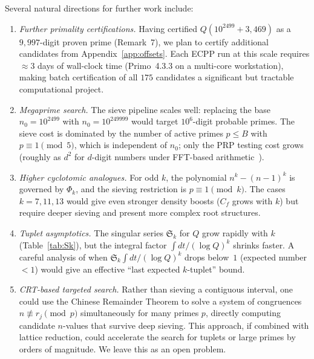 \documentclass[11pt,a4paper]{article}
\theoremstyle{plain}
\theoremstyle{definition}
\theoremstyle{remark}
\begin{document}
Several natural directions for further work include:
\begin{enumerate}[label=(\roman*)]
\item \emph{Further primality certifications.} Having certified $Q(10^{2499} + 3{,}469)$ as a $9{,}997$-digit proven prime (Remark~7), we plan to certify additional candidates from Appendix~\ref{app:offsets}. Each ECPP run at this scale requires $\approx 3$ days of wall-clock time (Primo~4.3.3 on a multi-core workstation), making batch certification of all $175$ candidates a significant but tractable computational project.

\item \emph{Megaprime search.} The sieve pipeline scales well: replacing the base $n_0 = 10^{2499}$ with $n_0 = 10^{249999}$ would target $10^6$-digit probable primes. The sieve cost is dominated by the number of active primes $p \le B$ with $p \equiv 1 \pmod{5}$, which is independent of $n_0$; only the PRP testing cost grows (roughly as $d^2$ for $d$-digit numbers under FFT-based arithmetic~\cite{crandall2005}).

\item \emph{Higher cyclotomic analogues.} For odd $k$, the polynomial $n^k - (n-1)^k$ is governed by $\Phi_k$, and the sieving restriction is $p \equiv 1 \pmod{k}$. The cases $k = 7, 11, 13$ would give even stronger density boosts ($C_f$ grows with $k$) but require deeper sieving and present more complex root structures.

\item \emph{Tuplet asymptotics.} The singular series $\mathfrak{S}_k$ for $Q$ grow rapidly with $k$ (Table~\ref{tab:Sk}), but the integral factor $\int dt/(\log Q)^k$ shrinks faster. A careful analysis of when $\mathfrak{S}_k \int dt/(\log Q)^k$ drops below~$1$ (expected number $< 1$) would give an effective ``last expected $k$-tuplet'' bound.

\item \emph{CRT-based targeted search.} Rather than sieving a contiguous interval, one could use the Chinese Remainder Theorem to solve a system of congruences $n \not\equiv r_j \pmod{p}$ simultaneously for many primes $p$, directly computing candidate $n$-values that survive deep sieving. This approach, if combined with lattice reduction, could accelerate the search for tuplets or large primes by orders of magnitude. We leave this as an open problem.
\end{enumerate}


\appendix
\end{document}
